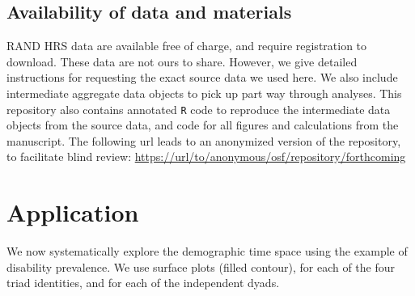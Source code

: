 \documentclass{bmcart}
\begin{document}
\subsection*{Availability of data and materials}
RAND HRS data are available free of charge, and require registration to download. These data are not ours to share. However, we give detailed instructions for requesting the exact source data we used here. We also include intermediate aggregate data objects to pick up part way through analyses. This repository also contains annotated \texttt{R} code to reproduce the intermediate data objects from the source data, and code for all figures and calculations from the manuscript.
The following url leads to an anonymized version of the repository, to facilitate blind review:
\url{https://url/to/anonymous/osf/repository/forthcoming}

\section{Application}
We now systematically explore the demographic time space using the example of disability prevalence. We use surface plots (filled contour), for each of the four triad identities, and for each of the independent dyads.


\end{document}
